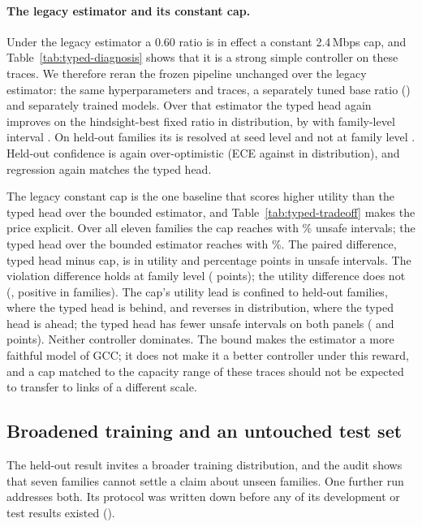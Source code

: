 \documentclass[10pt]{article}
\begin{document}
\paragraph{The legacy estimator and its constant cap.}
Under the legacy estimator a 0.60 ratio is in effect a constant 2.4\,Mbps cap, and Table~\ref{tab:typed-diagnosis} shows that it is a strong simple controller on these traces. We therefore reran the frozen pipeline unchanged over the legacy estimator: the same hyperparameters and traces, a separately tuned base ratio (\TypedUnboundedBaseRatio{}) and separately trained models. Over that estimator the typed head again improves on the hindsight-best fixed ratio in distribution, by \TypedAuditIdOtherVsCap{} with family-level interval \TypedAuditIdOtherVsCapT{}. On held-out families its \TypedAuditOodOtherVsCap{} is resolved at seed level \TypedAuditOodOtherVsCapSeed{} and not at family level \TypedAuditOodOtherVsCapT{}. Held-out confidence is again over-optimistic (ECE \TypedUnboundedOodBayesEce{} against \TypedUnboundedIdBayesEce{} in distribution), and regression again matches the typed head.

The legacy constant cap is the one baseline that scores higher utility than the typed head over the bounded estimator, and Table~\ref{tab:typed-tradeoff} makes the price explicit. Over all eleven families the cap reaches \TypedAuditAllCapUtility{} with \TypedAuditAllCapUnsafe\% unsafe intervals; the typed head over the bounded estimator reaches \TypedAllBayesUtility{} with \TypedAllBayesUnsafe\%. The paired difference, typed head minus cap, is \TypedAuditAllCrossUtility{} in utility and \TypedAuditAllCrossUnsafe{} percentage points in unsafe intervals. The violation difference holds at family level (\TypedAuditAllCrossUnsafeFamily{} points); the utility difference does not (\TypedAuditAllCrossUtilityT{}, positive in \TypedAuditAllCrossUtilityPositive{} families). The cap's utility lead is confined to held-out families, where the typed head is \TypedAuditOodCrossUtility{} behind, and reverses in distribution, where the typed head is \TypedAuditIdCrossUtility{} ahead; the typed head has fewer unsafe intervals on both panels (\TypedAuditIdCrossUnsafe{} and \TypedAuditOodCrossUnsafe{} points). Neither controller dominates. The bound makes the estimator a more faithful model of GCC; it does not make it a better controller under this reward, and a cap matched to the capacity range of these traces should not be expected to transfer to links of a different scale.

\subsection{Broadened training and an untouched test set}
\label{sec:typed-broad}
The held-out result invites a broader training distribution, and the audit shows that seven families cannot settle a claim about unseen families. One further run addresses both. Its protocol was written down before any of its development or test results existed ().
\end{document}
